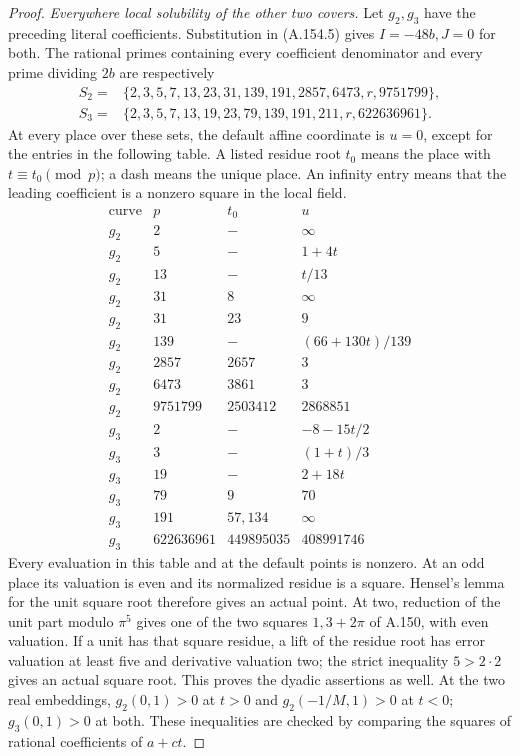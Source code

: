 \begin{proof}


\emph{Everywhere local solubility of the other two covers.}
Let \(g_2,g_3\) have the preceding literal coefficients.
Substitution in (A.154.5) gives \(I=-48b,J=0\) for both.
The rational primes containing every coefficient denominator
and every prime dividing \(2b\) are respectively
\[
 \begin{split}
 S_2={}&\{2,3,5,7,13,23,31,139,191,2857,6473,r,9751799\},\\
 S_3={}&\{2,3,5,7,13,19,23,79,139,191,211,r,622636961\}.
 \end{split}
\tag{A.154.15}
\]
At every place over these sets, the default affine coordinate
is \(u=0\), except for the entries in the following table.
A listed residue root \(t_0\) means the place with
\(t\equiv t_0\pmod p\); a dash means the unique place.
An infinity entry means that the leading coefficient is
a nonzero square in the local field.
\[
\begin{array}{c|r|r|c}
\text{curve}&p&t_0&u\\\hline
g_2&2&-&\infty\\
g_2&5&-&1+4t\\
g_2&13&-&t/13\\
g_2&31&8&\infty\\
g_2&31&23&9\\
g_2&139&-&(66+130t)/139\\
g_2&2857&2657&3\\
g_2&6473&3861&3\\
g_2&9751799&2503412&2868851\\\hline
g_3&2&-&-8-15t/2\\
g_3&3&-&(1+t)/3\\
g_3&19&-&2+18t\\
g_3&79&9&70\\
g_3&191&57,134&\infty\\
g_3&622636961&449895035&408991746
\end{array}
\tag{A.154.16}
\]
Every evaluation in this table and at the default points
is nonzero.  At an odd place its valuation is even and
its normalized residue is a square.  Hensel's lemma for
the unit square root therefore gives an actual point.
At two, reduction of the unit part modulo \(\pi^5\)
gives one of the two squares \(1,3+2\pi\) of A.150,
with even valuation.  If a unit has that square residue,
a lift of the residue root has error valuation at least
five and derivative valuation two; the strict inequality
\(5>2\cdot2\) gives an actual square root.  This proves
the dyadic assertions as well.
At the two real embeddings, \(g_2(0,1)>0\) at \(t>0\)
and \(g_2(-1/M,1)>0\) at \(t<0\); \(g_3(0,1)>0\)
at both.  These inequalities are checked by comparing
the squares of rational coefficients of \(a+ct\).


\end{proof}
